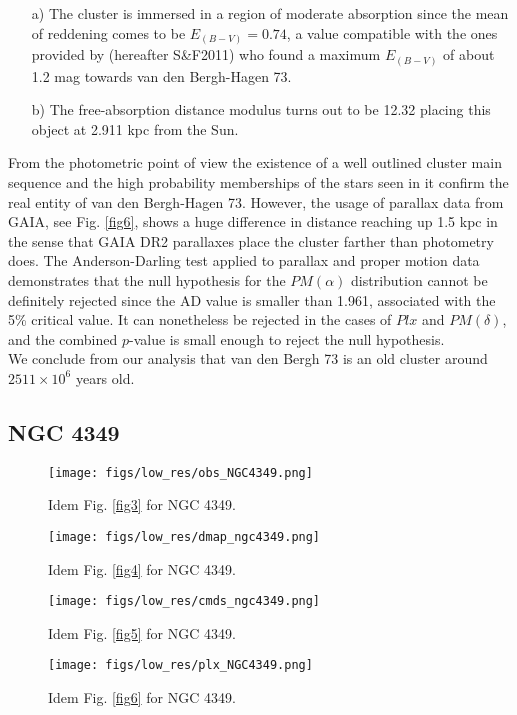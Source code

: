 \documentclass{aa}
\begin{document}
\begin{itemize}
\item [a)] The cluster is immersed in a region of moderate absorption since the
mean of reddening comes to be $E_{(B-V)} = 0.74$, a value compatible with the
ones provided by \cite{Schlafly_2011} (hereafter S\&F2011) who
found a maximum $E_{(B-V)}$ of about 1.2 mag towards van den Bergh-Hagen 73.
\item [b)] The free-absorption distance modulus turns out to be 12.32 placing
this object at 2.911 kpc from the Sun.
\end{itemize}

From the photometric point of view the existence of a well outlined cluster main
sequence and the high probability memberships of the stars seen in it confirm
the real entity of van den Bergh-Hagen 73. However, the usage of parallax data
from GAIA, see Fig. \ref{fig6}, shows a huge difference in distance reaching
up 1.5 kpc in the sense that GAIA DR2 parallaxes place the cluster farther than
photometry does. The Anderson-Darling test applied to parallax and proper motion
data demonstrates that the null hypothesis for the $PM(\alpha)$ distribution
cannot be definitely rejected since the AD value is smaller than 1.961,
associated with the 5\% critical value. It can nonetheless be rejected in the
cases of $Plx$ and $PM(\delta)$, and the combined $p$-value is small enough to
reject the null hypothesis.\\

We conclude from our analysis that van den Bergh 73 is an old cluster around
$2511\times10^6$ years old.



\subsection{NGC 4349}

\begin{figure*}[ht]
    \centering
    \texttt{[image: figs/low\_res/obs\_NGC4349.png]}
    \caption{Idem Fig. \ref{fig3} for NGC 4349.}
    \label{fig63}
\end{figure*}
\begin{figure*}[ht]
    \centering
    \texttt{[image: figs/low\_res/dmap\_ngc4349.png]}
    \caption{Idem Fig. \ref{fig4} for NGC 4349.}
    \label{fig64}
\end{figure*}
\begin{figure*}[ht]
    \centering
    \texttt{[image: figs/low\_res/cmds\_ngc4349.png]}
    \caption{Idem Fig. \ref{fig5} for NGC 4349.}
    \label{fig65}
\end{figure*}
\begin{figure*}[ht]
    \centering
    \texttt{[image: figs/low\_res/plx\_NGC4349.png]}
    \caption{Idem Fig. \ref{fig6} for NGC 4349.}
    \label{fig66}
\end{figure*}
\end{document}
